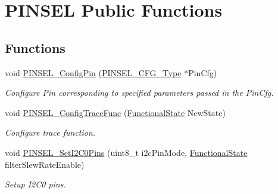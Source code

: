 \hypertarget{group___p_i_n_s_e_l___public___functions}{\section{\-P\-I\-N\-S\-E\-L \-Public \-Functions}
\label{group___p_i_n_s_e_l___public___functions}
}
\subsection*{\-Functions}
\begin{DoxyCompactItemize}
\item 
void \hyperlink{group___p_i_n_s_e_l___public___functions_ga771fcbed8f7ee806292e06e283611dc9}{\-P\-I\-N\-S\-E\-L\-\_\-\-Config\-Pin} (\hyperlink{struct_p_i_n_s_e_l___c_f_g___type}{\-P\-I\-N\-S\-E\-L\-\_\-\-C\-F\-G\-\_\-\-Type} $\ast$\-Pin\-Cfg)
\begin{DoxyCompactList}\small\item\em \-Configure \-Pin corresponding to specified parameters passed in the \-Pin\-Cfg. \end{DoxyCompactList}\item 
void \hyperlink{group___p_i_n_s_e_l___public___functions_ga9a48ea7b433ed1a2cb149627cf5c7c6b}{\-P\-I\-N\-S\-E\-L\-\_\-\-Config\-Trace\-Func} (\hyperlink{group___l_p_c___types___public___types_gac9a7e9a35d2513ec15c3b537aaa4fba1}{\-Functional\-State} \-New\-State)
\begin{DoxyCompactList}\small\item\em \-Configure trace function. \end{DoxyCompactList}\item 
void \hyperlink{group___p_i_n_s_e_l___public___functions_gacb6281f39ff79f79e9c29487f89a8b33}{\-P\-I\-N\-S\-E\-L\-\_\-\-Set\-I2\-C0\-Pins} (uint8\-\_\-t i2c\-Pin\-Mode, \hyperlink{group___l_p_c___types___public___types_gac9a7e9a35d2513ec15c3b537aaa4fba1}{\-Functional\-State} filter\-Slew\-Rate\-Enable)
\begin{DoxyCompactList}\small\item\em \-Setup \-I2\-C0 pins. \end{DoxyCompactList}\end{DoxyCompactItemize}


